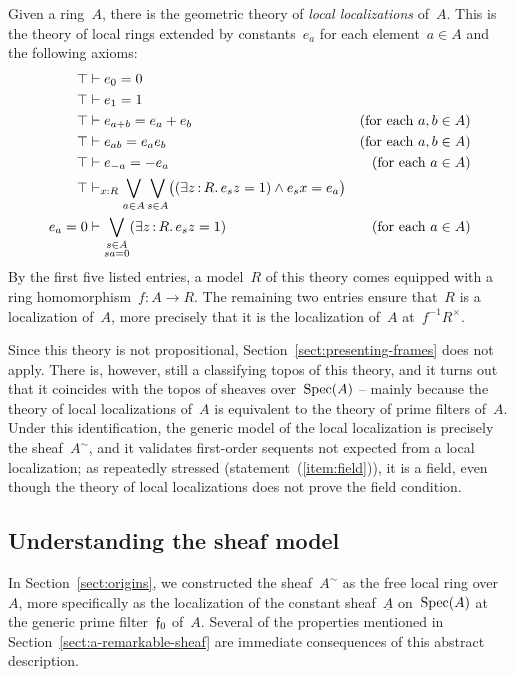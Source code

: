 \documentclass{ws-rv9x6}
\begin{document}
{\begin{remark}Given a ring~$A$, there is the geometric theory of \emph{local
localizations} of~$A$. This is the theory of local rings extended by constants~$e_a$
for each element~$a \in A$ and the following axioms:
\begin{align*}
  \top &\vdash e_0 = 0 \\
  \top &\vdash e_1 = 1 \\
  \top &\vdash e_{a + b} = e_a + e_b & \text{(for each~$a,b \in A$)} \\
  \top &\vdash e_{ab} = e_a e_b & \text{(for each~$a,b \in A$)} \\
  \top &\vdash e_{-a} = -e_a & \text{(for each~$a \in A$)} \\
  \top &\vdash_{x:R} \bigvee_{a \in A} \bigvee_{s \in A} \bigl((\exists z\,{:}\,R\mathpunct{.}
  e_s z = 1) \wedge e_s x = e_a\bigr) \\
  e_a = 0 &\vdash \bigvee_{\substack{s \in A\\sa = 0}} (\exists z\,{:}\,R\mathpunct{.} e_s z = 1) & \text{(for each~$a \in A$)}
\end{align*}
By the first five listed entries, a model~$R$ of this theory comes equipped
with a ring homomorphism~$f : A \to R$. The remaining two entries ensure that~$R$ is
a localization of~$A$, more precisely that it is the localization of~$A$
at~$f^{-1}R^\times$.

Since this theory is not propositional, Section~\ref{sect:presenting-frames}
does not apply. There is, however, still a classifying topos of this theory, and it turns
out that it coincides with the topos of sheaves over~$\mathrm{Spec}(A)$ -- mainly
because the theory of local localizations of~$A$ is equivalent to the theory of
prime filters of~$A$. Under this identification, the generic model of the local
localization is precisely the sheaf~$A^\sim$, and it validates first-order
sequents not expected from a local localization; as repeatedly stressed
(statement~(\ref{item:field})), it is a field, even though the theory of local
localizations does not prove the field condition.
\end{remark}


\subsection{Understanding the sheaf model}
\label{sect:understanding}

In Section~\ref{sect:origins}, we constructed the sheaf~$A^\sim$ as the free
local ring over~$A$, more specifically as the localization of the constant
sheaf~$\underline{A}$ on~$\mathrm{Spec}(A)$ at the generic prime filter~$\mathfrak{f}_0$
of~$A$. Several of the properties mentioned in
Section~\ref{sect:a-remarkable-sheaf} are immediate consequences of this
abstract description.

}
\end{document}
